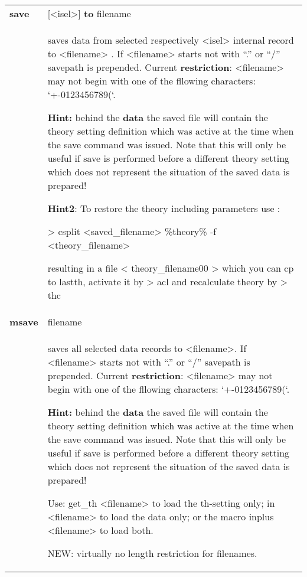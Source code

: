 \documentclass[]{article}
\begin{document}
\begin{longtable}[]{@{}ll@{}}
\toprule
\endhead
\textbf{save} & {[}\textless{}isel\textgreater{}{]} \textbf{to}
filename\tabularnewline
\begin{minipage}[t]{0.47\columnwidth}\raggedright
\strut
\end{minipage} & \begin{minipage}[t]{0.47\columnwidth}\raggedright
saves data from selected respectively \textless{}isel\textgreater{}
internal record to \textless{}filename\textgreater{} . If
\textless{}filename\textgreater{} starts not with ``.'' or ``/''
savepath is prepended. Current \textbf{restriction}:
\textless{}filename\textgreater{} may not begin with one of the fllowing
characters: `+-0123456789(`.

\textbf{Hint:} behind the \textbf{data} the saved file will contain the
theory setting definition which was active at the time when the save
command was issued. Note that this will only be useful if save is
performed before a different theory setting which does not represent the
situation of the saved data is prepared!

\textbf{Hint2}: To restore the theory including parameters use :

\textgreater{} csplit \textless{}saved\_filename\textgreater{}
\%theory\% -f \textless{}theory\_filename\textgreater{}

resulting in a file \textless{} theory\_filename00 \textgreater{} which
you can cp to lastth, activate it by \textgreater{} acl and recalculate
theory by \textgreater{} thc\strut
\end{minipage}\tabularnewline
\textbf{msave} & filename\tabularnewline
\begin{minipage}[t]{0.47\columnwidth}\raggedright
\strut
\end{minipage} & \begin{minipage}[t]{0.47\columnwidth}\raggedright
saves all selected data records to \textless{}filename\textgreater{}. If
\textless{}filename\textgreater{} starts not with ``.'' or ``/''
savepath is prepended. Current \textbf{restriction}:
\textless{}filename\textgreater{} may not begin with one of the fllowing
characters: `+-0123456789(`.

\textbf{Hint:} behind the \textbf{data} the saved file will contain the
theory setting definition which was active at the time when the save
command was issued. Note that this will only be useful if save is
performed before a different theory setting which does not represent the
situation of the saved data is prepared!

Use: get\_th \textless{}filename\textgreater{} to load the th-setting
only; in \textless{}filename\textgreater{} to load the data only; or the
macro inplus \textless{}filename\textgreater{} to load both.

NEW: virtually no length restriction for filenames.\strut
\end{minipage}\tabularnewline
\bottomrule
\end{longtable}
\end{document}
